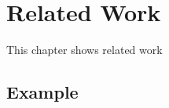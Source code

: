\chapter{Related Work}
\label{cap:Related Work}



This chapter shows related work

\section{Example}
